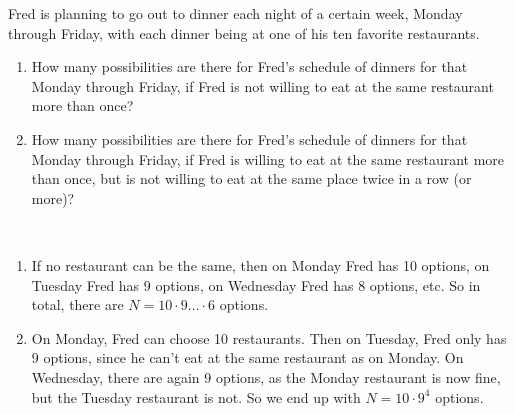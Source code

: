 

\setcounter{theorem}{2}
\begin{exercise} [BH.1.3]
	Fred is planning to go out to dinner each night of a certain week, Monday through Friday, with each dinner being at one of his ten favorite restaurants.
	\begin{enumerate}
		\item How many possibilities are there for Fred’s schedule of dinners for that Monday through Friday, if Fred is not willing to eat at the same restaurant more than once?
		\item How many possibilities are there for Fred’s schedule of dinners for that Monday through Friday, if Fred is willing to eat at the same restaurant more than once, but is not willing to eat at the same place twice in a row (or more)?
	\end{enumerate}
\begin{solution}~
	\begin{enumerate}
		\item If no restaurant can be the same, then on Monday Fred has 10 options, on Tuesday Fred has 9 options, on Wednesday Fred has 8 options, etc. So in total, there are $N=10\cdot 9\ldots\cdot 6$ options.
		\item On Monday, Fred can choose 10 restaurants. Then on Tuesday, Fred only has 9 options, since he can't eat at the same restaurant as on Monday. On Wednesday, there are again 9 options, as the Monday restaurant is now fine, but the Tuesday restaurant is not. So we end up with $N=10\cdot 9^4$ options.
	\end{enumerate}
\end{solution}
\end{exercise}



